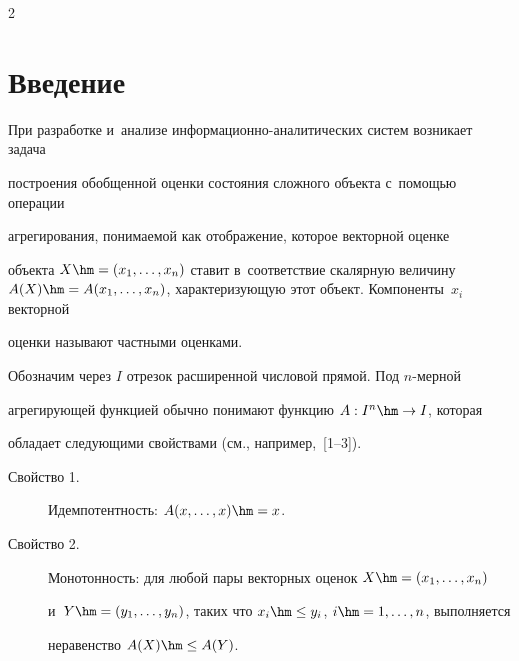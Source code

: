\begin{multicols}{2}





\label{st\stat}





\section{Введение}





При разработке и~анализе  информационно-ана\-ли\-ти\-че\-ских сис\-тем возникает задача 


по\-стро\-ения обобщенной оценки состояния сложного объекта с~по\-мощью операции 


агрегирования,  понимаемой как отображение, которое векторной оценке 


объекта $X \hm= (x_1,\ldots, x_n)$ ставит в~соответствие скалярную величину  $A(X) \hm= 


A(x_1,\ldots, x_n)$,  характеризующую этот объект. Компоненты~$x_i$ векторной 


оценки называют частными оценками.





Обозначим через $I$ отрезок расширенной чис\-ло\-вой прямой. Под $n$-мер\-ной 


агрегирующей функцией обычно понимают функцию $A: I^n\hm\rightarrow I$, \mbox{которая} 


обладает следующими свойствами (см., например,~[1--3]).





\begin{description}


\item[Свойство 1.] Идемпотентность: $A(x, \ldots, x) \hm= x$.





\item[Свойство 2.] Монотонность: для любой пары векторных оценок $X \hm= (x_1,\ldots, x_n)$ 


и~$Y \hm= (y_1,\ldots , y_n)$, таких что $x_i\hm\leq y_i$, $i\hm=1,\ldots ,n$, выполняется 


неравенство $A(X)\hm\leq A(Y)$.






\end{description}
\end{multicols}
